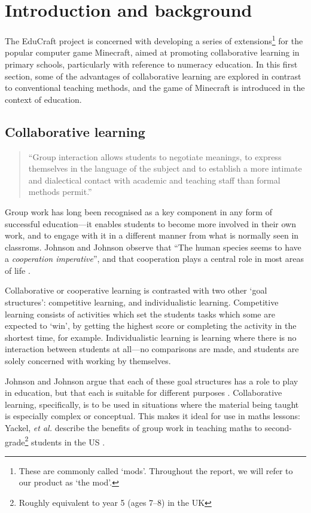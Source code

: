 \chapter{Introduction and background}
The EduCraft project is concerned with developing a series of
extensions\footnote{These are commonly called `mods'. Throughout the report, 
we will refer to our product as `the mod'.} for the popular computer game
Minecraft, aimed at promoting collaborative learning in primary schools,
particularly with reference to numeracy education. In this first section, some
of the advantages of collaborative learning are explored in contrast to
conventional teaching methods, and the game of Minecraft is introduced in the
context of education.

\section{Collaborative learning}
\begin{quote}
``Group interaction allows students to negotiate meanings, to express
themselves in the language of the subject and to establish a more intimate
and dialectical contact with academic and teaching staff than formal
methods permit.'' \cite[p.~1]{jacques00}
\end{quote}
Group work has long been recognised as a key component in any form of
successful education---it enables students to become more involved in their
own work, and to engage with it in a different manner from what is normally
seen in classroms. Johnson and Johnson observe that ``The human species seems
to have a \textit{cooperation imperative}'', and that cooperation plays
a central role in most areas of life \cite[p.~12]{johnson94}.

Collaborative or cooperative learning is contrasted with two other `goal
structures': competitive learning, and individualistic learning. Competitive
learning consists of activities which set the students tasks which some
are expected to `win', by getting the highest score or completing the activity
in the shortest time, for example. Individualistic learning is learning where
there is no interaction between students at all---no comparisons are made,
and students are solely concerned with working by themselves.

Johnson and Johnson argue that each of these goal structures has a role
to play in education, but that each is suitable for different
purposes \cite{johnson94}.  Collaborative learning, specifically, is to
be used in situations where the material being taught is especially
complex or conceptual. This makes it ideal for use in maths lessons:
Yackel, \textit{et al.} describe the benefits of group work in teaching maths
to second-grade\footnote{Roughly equivalent to year 5 (ages 7--8) in the UK}
students in the US \cite{yackel91}.

